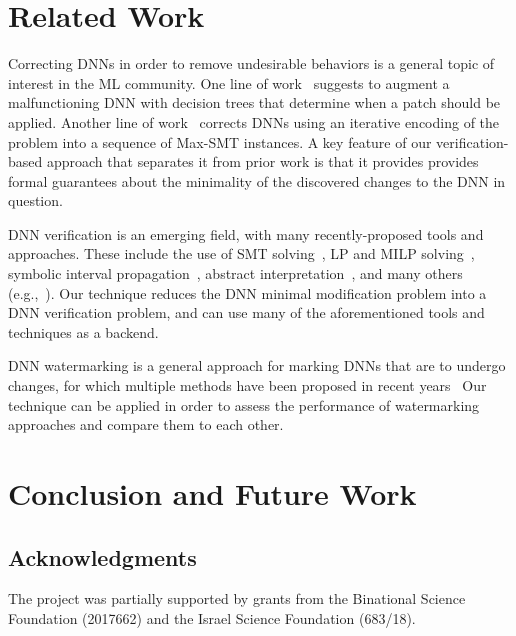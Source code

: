 \documentclass{easychair}
\newcommand{\guy}[1]{\marginpar{\textcolor{orange}{Guy: #1}}}
\begin{document}
\guy{add text about network correction}
\guy{analyze the tables in the text, explain the interesting findings}

\section{Related Work}
\label{sec:relatedWork}

Correcting DNNs in order to remove undesirable behaviors is a general
topic of interest in the ML community. One line of
work~\cite{KaLe18,KaFu18} suggests to augment a malfunctioning DNN
with decision trees that determine when a patch should be
applied. Another line of work~\cite{SoTh19} corrects DNNs using an
iterative encoding of the problem into a sequence of Max-SMT
instances. A key feature of our verification-based approach that
separates it from prior work is that it provides provides formal
guarantees about the minimality of the discovered changes to the DNN
in question.

DNN verification is an emerging field, with many recently-proposed
tools and approaches. These include the use of SMT
solving~\cite{HuKwWaWu17,KaBaDiJuKo17Reluplex,KaHuIbJuLaLiShThWuZeDiKoBa19Marabou},
LP and MILP solving~\cite{Ehlers2017,TjXiTe19}, symbolic interval
propagation~\cite{WaPeWhYaJa18}, abstract
interpretation~\cite{GeMiDrTsChVe18}, and many others
(e.g.,~\cite{BuTuToKoMu18,DuJhSaTi18,LoMa17,NaKaRySaWa17,SiGePuVe19}).
Our technique reduces the DNN minimal modification problem into a DNN
verification problem, and can use many of the aforementioned tools and
techniques as a backend.

DNN watermarking is a general approach for marking DNNs that are to undergo
changes, for which multiple methods have been proposed in recent years~\cite{AdBaPiKeWatermarking,ChRoKo18,LePeTr19,UcNaSaSa17,VeUsTaOcGa11}
Our technique can be applied in order to assess the
performance of watermarking approaches and compare them to each other.


\section{Conclusion and Future Work}
\label{sec:conclusion}

\subsection*{Acknowledgments}
The project was partially supported by grants from the Binational Science
Foundation (2017662) and the Israel Science Foundation (683/18).

\guy{TODO: Ask the Yossis for additional acks}



\end{document}
